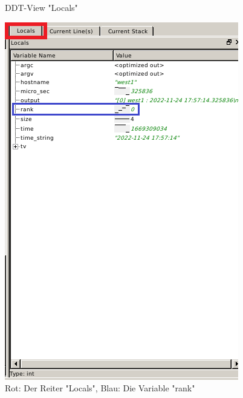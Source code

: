 \documentclass[12pt]{article}
\begin{document}
\begin{sloppypar}
\begin{figure}[htbp]
    \caption{DDT-View "Locals"}
    \begin{minipage}[t]{0.45\textwidth}
        \vspace{0pt}
        \includegraphics[width=\textwidth]{res/ddt-view-locals.PNG}
        \caption*{Rot: Der Reiter "Locals", Blau: Die Variable "rank"}
    \end{minipage}
    \hspace{0.05\textwidth}
    \begin{minipage}[t]{0.45\textwidth}
        \vspace{0pt}

\end{minipage}
\end{figure}
\end{sloppypar}
\end{document}
